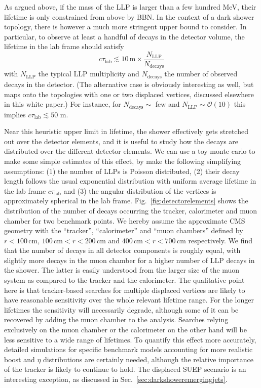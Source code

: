 As argued above, if the mass of the LLP is larger than a few hundred MeV, their lifetime is only constrained from above by BBN. In the context of a dark shower topology, there is however a much more stringent upper bound to consider. In particular, to observe at least a handful of decays in the detector volume, the lifetime in the lab frame should satisfy
\begin{equation}
c\tau_{\text{lab}} \lesssim 10 \,\text{m}\times \frac{N_{\text{LLP}}}{N_{\text{decays}}}
\end{equation}
with $N_{\text{LLP}}$ the typical LLP multiplicity and $N_{\text{decays}}$ the number of observed decays in the detector. (The alternative case is obviously interesting as well, but maps onto the topologies with one or two displaced vertices, discussed elsewhere in this white paper.) For instance, for $N_{\text{decays}}\sim$ few and $N_{\text{LLP}}\sim \mathcal{O}(10)$ this implies $c\tau_{\text{lab}}\lesssim 50$ m. 



Near this heuristic upper limit in lifetime, the shower effectively gets stretched out over the detector elements, and it is useful to study how the decays are distributed over the different detector elements. We can use a toy monte carlo to make some simple estimates of this effect, by make the following simplifying assumptions: (1) the number of LLPs is Poisson distributed, (2) their decay length follows the usual exponential distribution with uniform average lifetime in the lab frame $c\tau_{\text{lab}}$ and (3) the angular distribution of the vertices is approximately spherical in the lab frame. Fig.~\ref{fig:detectorelements} shows the distribution of the number of decays occurring the tracker, calorimeter and muon chamber for two benchmark points. We hereby assume the approximate CMS geometry with the ``tracker'', ``calorimeter'' and ``muon chambers'' defined by $r<100\, \text{cm}$, $100\, \text{cm}<r<200\, \text{cm}$  and  $400\, \text{cm}<r<700\, \text{cm}$ respectively. We find that the number of decays in all detector components is roughly equal, with slightly more decays in the muon chamber for a higher number of LLP decays in the shower. The latter is easily understood from the larger size of the muon system as compared to the tracker and the calorimeter.  The qualitative point here is that tracker-based searches for multiple displaced vertices are likely to have reasonable sensitivity over the whole relevant lifetime range. For the longer lifetimes the sensitivity will necessarily degrade, although some of it can be recovered by adding the muon chamber to the analysis. Searches relying exclusively on the muon chamber or the calorimeter on the other hand will be less sensitive to a wide range of lifetimes. To quantify this effect more accurately, detailed simulations for specific benchmark models accounting for more realistic boost and $\eta$ distributions are certainly needed, although the relative importance of the tracker is likely to continue to hold. The displaced SUEP scenario is an interesting exception, as discussed in Sec.~\ref{sec:darkshoweremergingjets}. 

